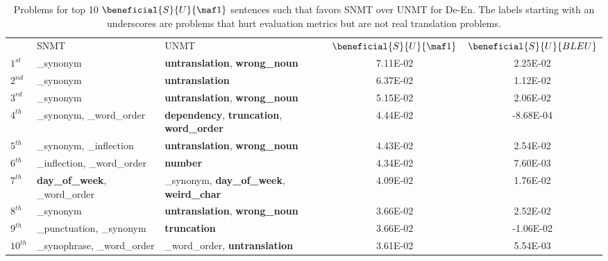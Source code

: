 \begin{table*}[t]
    \centering
    \footnotesize
    \begin{tabular}{lllcc}
    
 & SNMT & UNMT & $\beneficial{S}{U}{\maf1}$&$\beneficial{S}{U}{BLEU}$\\ 
$1^{st}$ &\_synonym&	\textbf{untranslation}, \textbf{wrong\_noun}& 7.11E-02& 2.25E-02\\
$2^{nd}$ &\_synonym&	\textbf{untranslation}& 6.37E-02& 1.12E-02\\
$3^{rd}$ &\_synonym&	\textbf{untranslation}, \textbf{wrong\_noun}& 5.15E-02& 2.06E-02\\
$4^{th}$ &\_synonym, \_word\_order&	\textbf{dependency}, \textbf{truncation}, \textbf{word\_order}& 4.44E-02& -8.68E-04\\
$5^{th}$ &\_synonym, \_inflection&	\textbf{untranslation}, \textbf{wrong\_noun}& 4.43E-02& 2.54E-02\\
$6^{th}$ &\_inflection, \_word\_order&	\textbf{number}& 4.34E-02& 7.60E-03\\
$7^{th}$ &\textbf{day\_of\_week}, \_word\_order&	\_synonym, \textbf{day\_of\_week}, \textbf{weird\_char}& 4.09E-02& 1.76E-02\\
$8^{th}$ &\_synonym&	\textbf{untranslation}, \textbf{wrong\_noun}& 3.66E-02& 2.52E-02\\
$9^{th}$ &\_punctuation, \_synonym&	\textbf{truncation}& 3.66E-02& -1.06E-02\\
$10^{th}$ &\_synophrase, \_word\_order&	\_word\_order, \textbf{untranslation}& 3.61E-02& 5.54E-03\\

    \end{tabular}
    \caption{Problems for top 10 $\beneficial{S}{U}{\maf1}$ sentences such that  favors SNMT over UNMT for De-En. The labels starting with an underscores are problems that hurt evaluation metrics but are not real translation problems. }
    \label{tab:snmt_better_mf1}
\end{table*}



